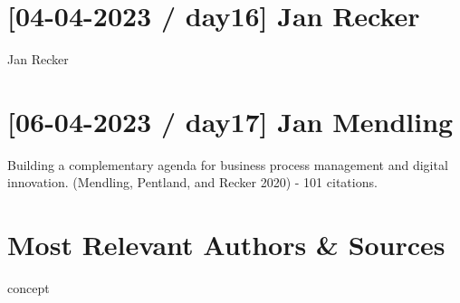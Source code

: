 \documentclass[
  letterpaper,
  DIV=11,
  numbers=noendperiod]{scrreprt}
\begin{document}
\hypertarget{day16-jan-recker}{%
\section{{[}04-04-2023 / day16{]} Jan Recker}\label{day16-jan-recker}}

Jan Recker


\hypertarget{day17-jan-mendling}{%
\section{{[}06-04-2023 / day17{]} Jan
Mendling}\label{day17-jan-mendling}}


Building a complementary agenda for business process management and
digital innovation. (Mendling, Pentland, and Recker 2020) - 101
citations.

\newpage{}

\hypertarget{most-relevant-authors-sources}{%
\section{Most Relevant Authors \&
Sources}\label{most-relevant-authors-sources}}

{concept}
\end{document}
